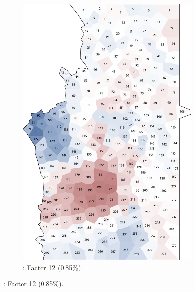 \documentclass[output=paper]{LSP/langsci}
\begin{document}
\begin{figure}
\begin{subfigure}[t]{0.3\textwidth}
\includegraphics[width=\textwidth]{illustrations/pickl_fig14}
\caption{: Factor 12 (0.85\%).}
\label{fig:pickl:14}
\end{subfigure}

\vskip11pt


\end{figure}
\end{document}
